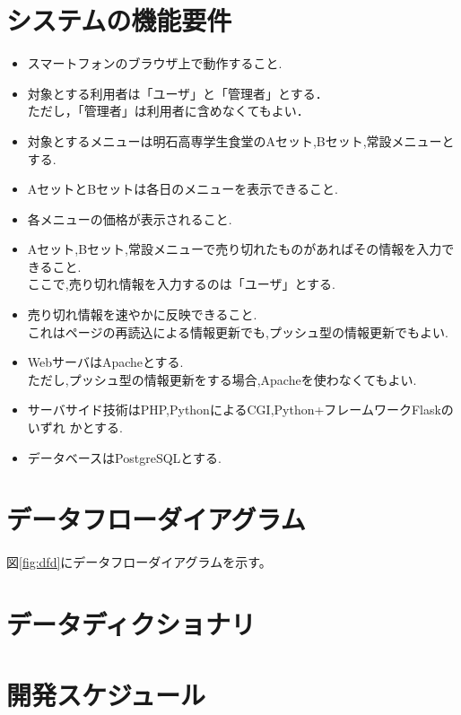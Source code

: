 \documentclass[dvipdfmx, 11pt]{jsarticle}
\begin{document}
\section{システムの機能要件}
    \begin{itemize}
        \item スマートフォンのブラウザ上で動作すること.
        \item 対象とする利用者は「ユーザ」と「管理者」とする． \\
            ただし，「管理者」は利用者に含めなくてもよい．
        \item 対象とするメニューは明石高専学生食堂のAセット,Bセット,常設メニューとする.
        \item AセットとBセットは各日のメニューを表示できること.
        \item 各メニューの価格が表示されること.
        \item Aセット,Bセット,常設メニューで売り切れたものがあればその情報を入力できること. \\
            ここで,売り切れ情報を入力するのは「ユーザ」とする.
        \item 売り切れ情報を速やかに反映できること. \\
            これはページの再読込による情報更新でも,プッシュ型の情報更新でもよい.
        \item WebサーバはApacheとする. \\
            ただし,プッシュ型の情報更新をする場合,Apacheを使わなくてもよい.
        \item サーバサイド技術はPHP,PythonによるCGI,Python+フレームワークFlaskのいずれ
        かとする.
        \item データベースはPostgreSQLとする.
    \end{itemize}

\section{データフローダイアグラム}
    図\ref{fig:dfd}にデータフローダイアグラムを示す。

\section{データディクショナリ}


\section{開発スケジュール}
\end{document}
